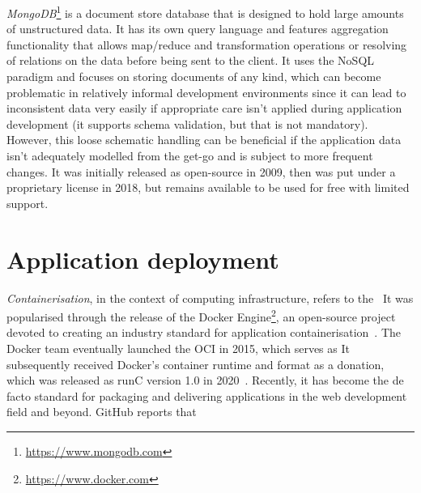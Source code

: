 \emph{MongoDB}\footnote{\url{https://www.mongodb.com}} is a document store database that is designed to hold large amounts of unstructured data.
It has its own query language and features aggregation functionality that allows map/reduce and transformation operations or resolving of relations on the data before being sent to the client.
It uses the \ac{NoSQL} paradigm and focuses on storing documents of any kind, which can become problematic in relatively informal development environments since it can lead to inconsistent data very easily if appropriate care isn't applied during application development (it supports schema validation, but that is not mandatory).
However, this loose schematic handling can be beneficial if the application data isn't adequately modelled from the get-go and is subject to more frequent changes.
It was initially released as open-source in 2009, then was put under a proprietary license in 2018, but remains available to be used for free with limited support.

\section{Application deployment}
\label{sec:application-deployment}

\emph{Containerisation}, in the context of computing infrastructure, refers to the~ It was popularised through the release of the Docker Engine\footnote{\url{https://www.docker.com}}, an open-source project devoted to creating an industry standard for application containerisation~\parencite{dockerRelease}.
The Docker team eventually launched the \ac{OCI} in 2015, which serves as  It subsequently received Docker's container runtime and format as a donation, which was released as runC version 1.0 in 2020~\parencite{openContainerInitiative}.
Recently, it has become the de facto standard for packaging and delivering applications in the web development field and beyond.
GitHub reports that~

